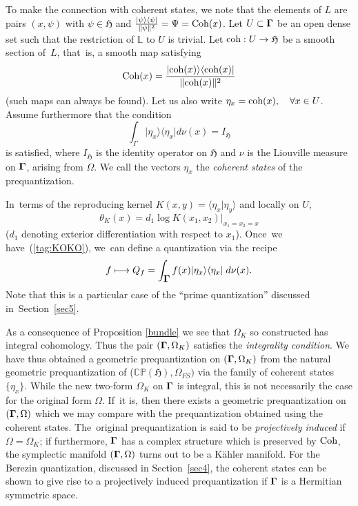 \documentclass[12pt]{amsart}
\numberwithin{equation}{section}
\theoremstyle{remark}
\newcommand\HH{\mathfrak H}
\newcommand{\prhs}{{\mathbb C\mathbb P}( \HH)}
\newcommand{\bigam}{\mbox{\boldmath $\Gamma$}}
\begin{document}
To make the connection with coherent states, we note that the elements of
$L$ are pairs $(x, \psi)$ with $\psi \in \HH$ and
$\frac{\vert\psi\rangle\langle\psi\vert}{\Vert\psi\Vert^{2}} = \Psi =
\mbox{\rm Coh}(x)$. Let $U \subset \bigam$ be an open dense set such that the
restriction of $\mathbb L$ to $U$ is trivial. Let $\mbox{\rm coh}: U \to \HH$
be a smooth section of~$L$, that~is, a smooth map satisfying
\begin{equation}
\mbox{\rm Coh}(x) = \frac{\vert \mbox{\rm coh}(x) \rangle \langle \mbox{\rm
coh}(x) \vert }{\Vert \mbox{\rm coh}(x) \Vert^2}
\end{equation}
(such maps can always be found). Let us also write $\eta_x = \mbox{\rm coh}(x),
\quad \forall x \in U$. Assume furthermore that the condition
\begin{equation}
\int_\Gamma \vert \eta_x\rangle \langle \eta_x \vert d\nu(x) = I_{\HH}
\label{tag:KOKO}
\end{equation}
is satisfied, where $I_{\HH}$ is the identity operator on $\HH$ and $\nu$ is
the Liouville measure on $\bigam$, arising from $\Omega$. We call the vectors
$\eta_x$ the {\em coherent states} of the prequantization.

In~terms of the reproducing kernel $K(x,y) = \langle \eta_x \vert \eta_y
\rangle$ and locally on $U$,
$$ \theta_K(x) = d_1 \log K(x_1,x_2) \vert_{x_1 = x_2 = x}   $$
($d_1$ denoting exterior differentiation with respect to $x_1$). Once~we
have~(\ref{tag:KOKO}), we~can define a quantization via the recipe
\begin{equation}
 f \longmapsto Q_f = \int_{\bigam}f(x)
         \vert\eta_x\rangle\langle\eta_x\vert\; d\nu(x) .  \label{tag:RECE}
\end{equation}
Note that this is a particular case of the ``prime quantization'' discussed
in~Section~\ref{sec5}.

As a consequence of Proposition \ref{bundle} we see that $\Omega_{K} $ so
constructed has integral cohomology. Thus the pair $(\bigam, \Omega_{K} )$
satisfies the {\em integrality condition}. We have thus obtained a geometric
prequantization on $(\bigam,\Omega_{K})$ from the natural geometric
prequantization of ($\prhs , \Omega_{FS})$ via the family of coherent states
$\{\eta_x\}$.  While the new two-form $\Omega_{K}$ on $\bigam$  is integral,
this is not necessarily the case for the original form $\Omega$. If~it is, then
there exists a geometric prequantization on $(\bigam,\Omega)$ which we may
compare with the prequantization obtained using the coherent states.
The~original prequantization is said to be {\em projectively induced} if
$\Omega = \Omega_K$; if furthermore, $\bigam$ has a complex structure which is
preserved by $\mbox{\rm Coh}$,  the symplectic manifold $(\bigam, \Omega)$
turns out to be a K\"ahler manifold. For the Berezin quantization, discussed
in Section~\ref{sec4}, the coherent states can be shown to give rise to a
projectively induced prequantization if $\bigam$ is a Hermitian symmetric
space.
\end{document}
